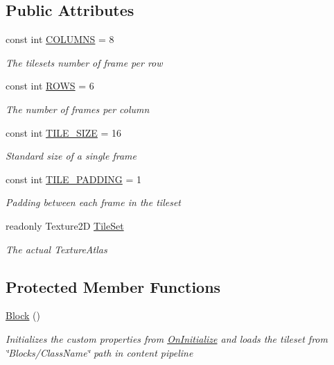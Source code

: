 \subsection*{Public Attributes}
\begin{DoxyCompactItemize}
\item 
const int \mbox{\hyperlink{class_super_mario_1_1_level_components_1_1_block_a43713182fbfda3b03101f02efb1d7fab}{C\+O\+L\+U\+M\+NS}} = 8
\begin{DoxyCompactList}\small\item\em The tileset\textquotesingle{}s number of frame per row \end{DoxyCompactList}\item 
const int \mbox{\hyperlink{class_super_mario_1_1_level_components_1_1_block_a28664c83dbf40588e8d769d440969f7c}{R\+O\+WS}} = 6
\begin{DoxyCompactList}\small\item\em The number of frames per column \end{DoxyCompactList}\item 
const int \mbox{\hyperlink{class_super_mario_1_1_level_components_1_1_block_a8a30649060abf7009666ac200da97d2e}{T\+I\+L\+E\+\_\+\+S\+I\+ZE}} = 16
\begin{DoxyCompactList}\small\item\em Standard size of a single frame \end{DoxyCompactList}\item 
const int \mbox{\hyperlink{class_super_mario_1_1_level_components_1_1_block_af3e47b544c2acb1f5cb0e3089ae7b774}{T\+I\+L\+E\+\_\+\+P\+A\+D\+D\+I\+NG}} = 1
\begin{DoxyCompactList}\small\item\em Padding between each frame in the tileset \end{DoxyCompactList}\item 
readonly Texture2D \mbox{\hyperlink{class_super_mario_1_1_level_components_1_1_block_a5176b65c486155dea95ef69ef94e16f4}{Tile\+Set}}
\begin{DoxyCompactList}\small\item\em The actual Texture\+Atlas \end{DoxyCompactList}\end{DoxyCompactItemize}
\subsection*{Protected Member Functions}
\begin{DoxyCompactItemize}
\item 
\mbox{\hyperlink{class_super_mario_1_1_level_components_1_1_block_a0a4ef8a1af9e91bd1e5774c90e74e65d}{Block}} ()
\begin{DoxyCompactList}\small\item\em Initializes the custom properties from \mbox{\hyperlink{class_super_mario_1_1_level_components_1_1_block_aecd2a6fa80ecbd7dd5cec2cdf4b149ec}{On\+Initialize}} and loads the tileset from \char`\"{}\+Blocks/\+Class\+Name\char`\"{} path in content pipeline \end{DoxyCompactList}\end{DoxyCompactItemize}
